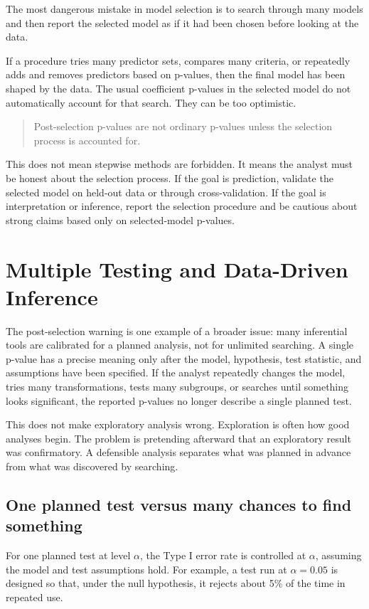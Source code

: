 The most dangerous mistake in model selection is to search through many models and then report the selected model as if it had been chosen before looking at the data.

If a procedure tries many predictor sets, compares many criteria, or repeatedly adds and removes predictors based on p-values, then the final model has been shaped by the data.  The usual coefficient p-values in the selected model do not automatically account for that search.  They can be too optimistic.

\begin{quote}
  Post-selection p-values are not ordinary p-values unless the selection process is accounted for.
\end{quote}

This does not mean stepwise methods are forbidden.  It means the analyst must be honest about the selection process.  If the goal is prediction, validate the selected model on held-out data or through cross-validation.  If the goal is interpretation or inference, report the selection procedure and be cautious about strong claims based only on selected-model p-values.

\section{Multiple Testing and Data-Driven Inference}

The post-selection warning is one example of a broader issue: many inferential tools are calibrated for a planned analysis, not for unlimited searching.  A single p-value has a precise meaning only after the model, hypothesis, test statistic, and assumptions have been specified.  If the analyst repeatedly changes the model, tries many transformations, tests many subgroups, or searches until something looks significant, the reported p-values no longer describe a single planned test.

This does not make exploratory analysis wrong.  Exploration is often how good analyses begin.  The problem is pretending afterward that an exploratory result was confirmatory.  A defensible analysis separates what was planned in advance from what was discovered by searching.

\subsection*{One planned test versus many chances to find something}

For one planned test at level \(\alpha\), the Type I error rate is controlled at \(\alpha\), assuming the model and test assumptions hold.  For example, a test run at \(\alpha=0.05\) is designed so that, under the null hypothesis, it rejects about 5\% of the time in repeated use.

